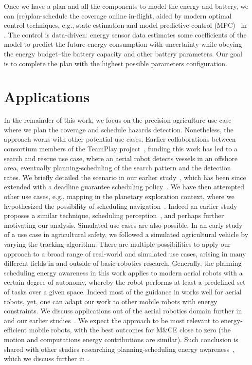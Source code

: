 Once we have a plan and all the components to model the energy and battery, we can (re)plan-schedule the coverage online in-flight, aided by modern optimal control techniques, e.g.,  state estimation and model predictive control (MPC)~\citep{rawlings2017model,simon2006optimal} in . The control is data-driven: energy sensor data estimates some coefficients of the model to predict the future energy consumption with uncertainty while obeying the energy budget--the battery capacity and other battery parameters. Our goal is to complete the plan with the highest possible parameters configuration.


\section{Applications}
\label{sec:applics}

In the remainder of this work, we focus on the precision agriculture use case where we plan the coverage and schedule hazards detection. Nonetheless, the approach works with other potential use cases. Earlier collaborations between consortium members of the TeamPlay project~\citep{teamplay}, funding this work has led to a search and rescue use case, where an aerial robot detects vessels in an offshore area, eventually planning-scheduling of the search pattern and the detection rates. We briefly detailed the scenario in our earlier study~\citep{seewald2019coarse}, which has been since extended with a deadline guarantee scheduling policy~\citep{rouxel2020prego}. We have then attempted other use cases, e.g., mapping in the planetary exploration context, where we hypothesized the possibility of scheduling navigation~\citep{seewald2020beyond}. Indeed an earlier study proposes a similar technique, scheduling perception~\citep{ondruska2015scheduled}, and perhaps further motivating our analysis. Simulated use cases are also possible. In an early study~\citep{zamanakos2020energy} of a use case in agricultural safety, we followed a simulated agricultural vehicle by varying the tracking algorithm. There are multiple possibilities to apply our approach to a broad range of real-world and simulated use cases, arising in many different fields in and outside of basic robotics research. Generally, the planning-scheduling energy awareness in this work applies to modern aerial robots with a certain degree of autonomy, whereby the robot performs at least a predefined set of tasks over a given space. Indeed most of the guidance in  works well for aerial robots, yet, one can adapt our work to other mobile robots with energy constraints. We discuss applications out of the aerial robotics domain further in  and our earlier studies~\citep{seewald2020beyond}. We expect the approach to be most relevant to energy-efficient mobile robots, with the best outcomes for M\&CE close to zero (the motion and computations energy contributions are similar). Such conclusion is shared with other studies researching planning-scheduling energy awareness~\citep{sudhakar2020balancing,ondruska2015scheduled,lahijanian2018resource,mei2005case,brateman2006energy}, which we discuss further in .


